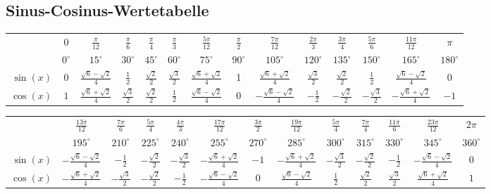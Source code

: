 \documentclass[10pt,a4paper]{article}
\begin{document}
\subsection*{Sinus-Cosinus-Wertetabelle}
\begin{center}
	\renewcommand{\arraystretch}{1.6}
	\footnotesize

	\begin{tabular}{r|c|c|c|c|c|c|c|c|c|c|c|c|c}
		  & 0 & $\frac{\pi}{12}$ & $\frac{\pi}{6}$ & $\frac{\pi}{4}$ & $\frac{\pi}{3}$ & $\frac{5\pi}{12}$ & $\frac{\pi}{2}$ & $\frac{7\pi}{12}$ & $\frac{2\pi}{3}$ & $\frac{3\pi}{4}$ & $\frac{5\pi}{6}$ & $\frac{11\pi}{12}$ & $\pi$ \\ \cline{2-14}	&$0^\circ$&$15^\circ$&$30^\circ$&$45^\circ$&$60^\circ$&$75^\circ$&$90^\circ$&$105^\circ$&$120^\circ$&$135^\circ$&$150^\circ$&$165^\circ$&$180^\circ$\\\hline
		$\sin(x)$&$0$&$\frac{\sqrt{6}-\sqrt{2}}{4}$&$\frac{1}{2}$&$\frac{\sqrt{2}}{2}$&$\frac{\sqrt{3}}{2}$&$\frac{\sqrt{6}+\sqrt{2}}{4}$&1&$\frac{\sqrt{6}+\sqrt{2}}{4}$&$\frac{\sqrt{3}}{2}$&$\frac{\sqrt{2}}{2}$&$\frac{1}{2}$&$\frac{\sqrt{6}-\sqrt{2}}{4}$&$0$\\\hline
		$\cos(x)$&$1$&$\frac{\sqrt{6}+\sqrt{2}}{4}$&$\frac{\sqrt{3}}{2}$&$\frac{\sqrt{2}}{2}$&$\frac{1}{2}$&$\frac{\sqrt{6}-\sqrt{2}}{4}$&0&$-\frac{\sqrt{6}-\sqrt{2}}{4}$&$-\frac{1}{2}$&$-\frac{\sqrt{2}}{2}$&$-\frac{\sqrt{3}}{2}$&$-\frac{\sqrt{6}+\sqrt{2}}{4}$&$-1$\\\hline
	\end{tabular}

	\vspace{0.5em}

	\begin{tabular}{r|c|c|c|c|c|c|c|c|c|c|c|c}
		  & $\frac{13\pi}{12}$ & $\frac{7\pi}{6}$ & $\frac{5\pi}{4}$ & $\frac{4\pi}{3}$ & $\frac{17\pi}{12}$ & $\frac{3\pi}{2}$ & $\frac{19\pi}{12}$ & $\frac{5\pi}{4}$ & $\frac{7\pi}{4}$ & $\frac{11\pi}{6}$ & $\frac{23\pi}{12}$ & $2\pi$ \\ \cline{2-13}	&$195^\circ$&$210^\circ$&$225^\circ$&$240^\circ$&$255^\circ$&$270^\circ$&$285^\circ$&$300^\circ$&$315^\circ$&$330^\circ$&$345^\circ$&$360^\circ$\\\hline
		$\sin(x)$&$-\frac{\sqrt{6}-\sqrt{2}}{4}$&$-\frac{1}{2}$&$-\frac{\sqrt{2}}{2}$&$-\frac{\sqrt{3}}{2}$&$-\frac{\sqrt{6}+\sqrt{2}}{4}$&$-1$&$-\frac{\sqrt{6}+\sqrt{2}}{4}$&$-\frac{\sqrt{3}}{2}$&$-\frac{\sqrt{2}}{2}$&$-\frac{1}{2}$&$-\frac{\sqrt{6}-\sqrt{2}}{4}$&$0$\\\hline
		$\cos(x)$&$-\frac{\sqrt{6}+\sqrt{2}}{4}$&$-\frac{\sqrt{3}}{2}$&$-\frac{\sqrt{2}}{2}$&$-\frac{1}{2}$&$-\frac{\sqrt{6}-\sqrt{2}}{4}$&$0$&$\frac{\sqrt{6}-\sqrt{2}}{4}$&$\frac{1}{2}$&$\frac{\sqrt{2}}{2}$&$\frac{\sqrt{3}}{2}$&$\frac{\sqrt{6}+\sqrt{2}}{4}$&$1$\\\hline	
	\end{tabular}
\end{center}
\end{document}

